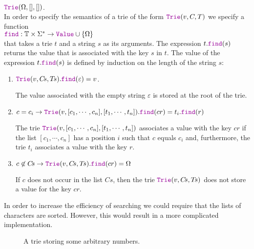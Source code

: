 \\[0.2cm]
\hspace*{1.3cm}
$\mytt{Trie}(\Omega, [], [])$.
\\[0.2cm]
In order to specify the semantics of a trie of the form $\mytt{Trie}(v,C,T)$ 
we specify a function
\\[0.2cm]
\hspace*{1.3cm} 
$\mytt{find}: \mathbb{T} \times \Sigma^* \rightarrow \mytt{Value} \cup \{ \Omega\}$
\\[0.2cm]
that takes a trie $t$ and a string $s$ as its arguments.  The expression $t.\mytt{find}(s)$ returns the
value that is associated with the key $s$ in $t$.  The value of the expression
$t.\mytt{find}(s)$ is defined by induction on the length of the  string $s$:
\begin{enumerate}
\item $\mytt{Trie}(v, C\!s, T\!s).\mytt{find}(\varepsilon) = v$.

      The value associated with the empty string $\varepsilon$ is stored at the root of the trie.
\item $c = c_i \rightarrow 
       \mytt{Trie}(v, [c_1, \cdots, c_n], [t_1, \cdots, t_n]).\mytt{find}(cr) = t_i.\mytt{find}(r)
      $

      The trie $\mytt{Trie}(v, [c_1, \cdots, c_n], [t_1, \cdots, t_n])$ associates a value with
      the key $cr$ if the list $[c_1, \cdots, c_n]$ has a position $i$ such that $c$ equals $c_i$
      and, furthermore, the trie  $t_i$ associates a value with the key  $r$.
\item $ c \not\in C\!s \rightarrow
       \mytt{Trie}(v, C\!s, T\!s).\mytt{find}(cr) = \Omega
      $

      If $c$ does not occur in the list $C\!s$, then the trie $\mytt{Trie}(v, C\!s, T\!s)$ does not store a value for
      the key $cr$.
\end{enumerate}
In order to increase the efficiency of searching we could require that the lists of characters are sorted.
However, this would result in a more complicated implementation.


\begin{figure}[!ht]
  \centering
  \caption{A trie storing some arbitrary numbers.}
  \label{fig:trie}
\end{figure}

